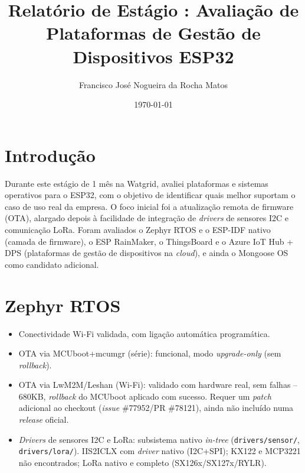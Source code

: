 \documentclass[a4paper,11pt]{article}
\begin{document}
\title{Relatório de Estágio : Avaliação de Plataformas de Gestão de Dispositivos ESP32}
\author{Francisco José Nogueira da Rocha Matos}
\date{\today}

\maketitle

\tableofcontents

\section{Introdução}
Durante este estágio de 1 mês na Watgrid, avaliei plataformas e sistemas operativos para o ESP32, com o objetivo de identificar quais melhor suportam o caso de uso real da empresa. O foco inicial foi a atualização remota de firmware (OTA), alargado depois à facilidade de integração de \textit{drivers} de sensores I2C e comunicação LoRa. Foram avaliados o Zephyr RTOS e o ESP-IDF nativo (camada de firmware), o ESP RainMaker, o ThingsBoard e o Azure IoT Hub + DPS (plataformas de gestão de dispositivos na \textit{cloud}), e ainda o Mongoose OS como candidato adicional.

\section{Zephyr RTOS}
\begin{itemize}
    \item Conectividade Wi-Fi validada, com ligação automática programática.
    \item OTA via MCUboot+mcumgr (série): funcional, modo \textit{upgrade-only} (sem \textit{rollback}).
    \item OTA via LwM2M/Leshan (Wi-Fi): validado com hardware real, sem falhas -- 680KB, \textit{rollback} do MCUboot aplicado com sucesso. Requer um \textit{patch} adicional ao checkout (\textit{issue} \#77952/PR \#78121), ainda não incluído numa \textit{release} oficial.
    \item \textit{Drivers} de sensores I2C e LoRa: subsistema nativo \textit{in-tree} (\texttt{drivers/sensor/}, \texttt{drivers/lora/}). IIS2ICLX com \textit{driver} nativo (I2C+SPI); KX122 e MCP3221 não encontrados; LoRa nativo e completo (SX126x/SX127x/RYLR).
\end{itemize}
\end{document}
